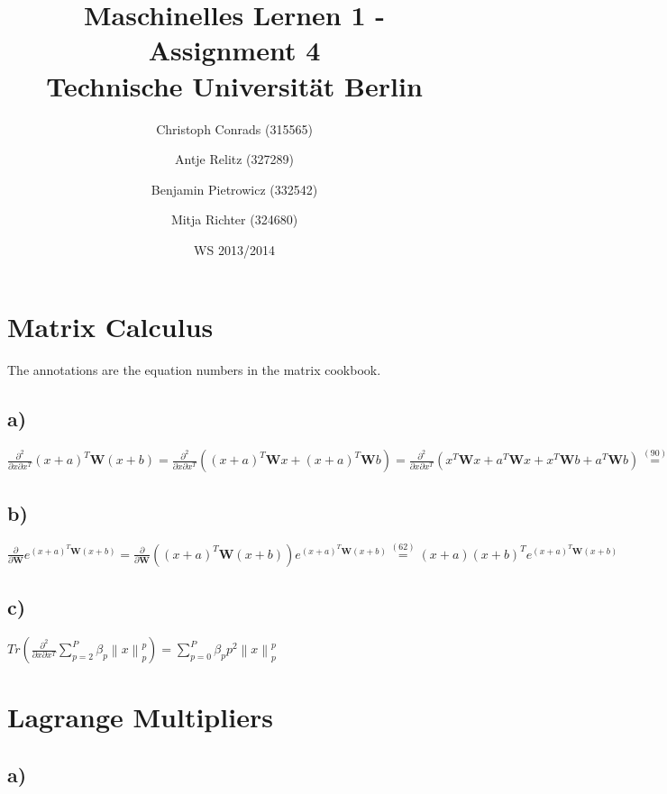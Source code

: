 \documentclass[paper=a4,fontsize=10pt,DIV11,BCOR10mm]{scrartcl}
\newcommand{\norm}[1]{\left\lVert#1\right\rVert}
\begin{document}
\title{Maschinelles Lernen 1 - Assignment 4\\
\small{Technische Universität Berlin}}


\author{\small{Christoph Conrads (315565)}\and \small{Antje Relitz (327289)}  \and \small{Benjamin Pietrowicz (332542)} \and \small{Mitja Richter (324680)} }

\date{WS 2013/2014}

\maketitle


\section{Matrix Calculus}
The annotations are the equation numbers in the matrix cookbook.

\subsection*{a)}
$ \frac{\partial^2}{\partial x \partial x^T}(x+a)^T \mathbf{W}(x+b) = \frac{\partial^2}{\partial x \partial x^T} ((x+a)^T \mathbf{W}x + (x+a)^T \mathbf{W}b) =  
\frac{\partial^2}{\partial x \partial x^T} (x^T\mathbf{W}x + a^T\mathbf{W}x + x^T\mathbf{W}b + a^T\mathbf{W}b) \stackrel{(90)}{=} \mathbf{W} + \mathbf{W}^T $

\subsection*{b)}

$ \frac{\partial}{\partial\mathbf{W}}e^{(x+a)^T\mathbf{W}(x+b)} = \frac{\partial}{\partial\mathbf{W}}((x+a)^T\mathbf{W}(x+b)) e^{(x+a)^T\mathbf{W}(x+b)} \stackrel{(62)}{=} (x+a)(x+b)^Te^{(x+a)^T\mathbf{W}(x+b)}$

\subsection*{c)}

$Tr(\frac{\partial^2}{\partial x\partial x^T} \sum_{p=2}^P \beta_p \norm{x}_p^p ) = 
\sum_{p=0}^P \beta_p p^2 \norm{x}_p^p$


\section{Lagrange Multipliers}

\subsection*{a)}
\end{document}
